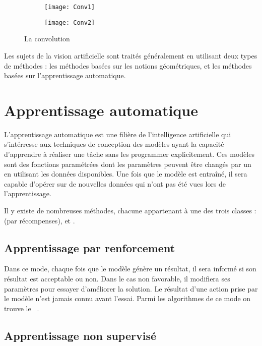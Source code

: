 \begin{figure}[H]
\centering
\begin{subfigure}{0.45\textwidth}
\texttt{[image: Conv1]}
\end{subfigure}
\begin{subfigure}{0.45\textwidth}
\texttt{[image: Conv2]}
\end{subfigure}
\caption{La convolution}{\cite{commonsConvolution}}
\end{figure}

Les sujets de la vision artificielle sont traités généralement en utilisant deux
types de méthodes : les méthodes basées sur les notions géométriques,
et les méthodes basées sur l'apprentissage automatique.

\section{Apprentissage automatique}

L'apprentissage automatique est une filière de
l'intelligence artificielle qui s'intérresse aux techniques de conception des
modèles ayant la capacité d'apprendre à réaliser une tâche sans les programmer
explicitement. Ces modèles sont des fonctions paramétrées dont les paramètres
peuvent être changés par un  en utilisant les données
disponibles. Une fois que le modèle est entraîné, il sera capable d'opérer sur
de nouvelles données qui n'ont pas été vues lors de l'apprentissage.

Il y existe de nombreuses méthodes, chacune appartenant à
une des trois classes :
 (par récompenses),
 et
.

\subsection{Apprentissage par renforcement}

Dans ce mode, chaque fois que le modèle génère un résultat, il sera informé
si son résultat est acceptable ou non. Dans le cas non favorable, il modifiera
ses paramètres pour essayer d'améliorer la solution. Le résultat d'une action
prise par le modèle n'est jamais connu avant l'essai. Parmi les algorithmes de ce
mode on trouve le ~\cite{Watkins1992}.

\subsection{Apprentissage non supervisé}

